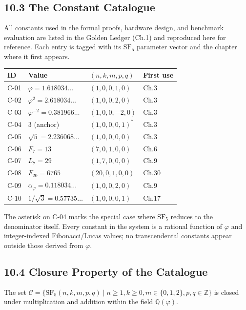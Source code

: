 \subsection{10.3 The Constant
Catalogue}\label{fa_29:constant-catalogue}

All constants used in the formal proofs, hardware
design, and benchmark evaluation are listed in the
Golden Ledger (Ch.1) and reproduced here for
reference. Each entry is tagged with its
$\mathrm{SF}_5$ parameter vector and the chapter
where it first appears.

\begin{longtable}[]{@{}llll@{}}
\toprule\noalign{}
ID & Value & $(n,k,m,p,q)$ & First use \\
\midrule\noalign{}
\endhead
\bottomrule\noalign{}
\endlastfoot
C-01 & $\varphi = 1.618034\ldots$ & $(1,0,0,1,0)$
& Ch.3 \\
C-02 & $\varphi^2 = 2.618034\ldots$ & $(1,0,0,2,0)$
& Ch.3 \\
C-03 & $\varphi^{-2} = 0.381966\ldots$ &
$(1,0,0,-2,0)$ & Ch.3 \\
C-04 & $3$ (anchor) & $(1,0,0,0,1)^*$ & Ch.3 \\
C-05 & $\sqrt{5} = 2.236068\ldots$ & $(1,0,0,0,0)$
& Ch.3 \\
C-06 & $F_7 = 13$ & $(7,0,1,0,0)$ & Ch.6 \\
C-07 & $L_7 = 29$ & $(1,7,0,0,0)$ & Ch.9 \\
C-08 & $F_{20} = 6765$ & $(20,0,1,0,0)$ & Ch.30 \\
C-09 & $\alpha_\varphi = 0.118034\ldots$ &
$(1,0,0,2,0)$ & Ch.9 \\
C-10 & $1/\sqrt{3} = 0.57735\ldots$ &
$(1,0,0,0,1)$ & Ch.17 \\
\end{longtable}

The asterisk on C-04 marks the special case where
$\mathrm{SF}_5$ reduces to the denominator itself.
Every constant in the system is a rational function
of $\varphi$ and integer-indexed Fibonacci/Lucas
values; no transcendental constants appear outside
those derived from $\varphi$.

\subsection{10.4 Closure Property of the
Catalogue}\label{fa_29:closure-property}

\begin{theorem}
\label{thm:catalogue-closure}
The set $\mathcal{C} = \{\mathrm{SF}_5(n,k,m,p,q)
\mid n \geq 1, k \geq 0, m \in \{0,1,2\}, p, q
\in \mathbb{Z}\}$ is closed under multiplication
and addition within the field
$\mathbb{Q}(\varphi)$.
\end{theorem}

